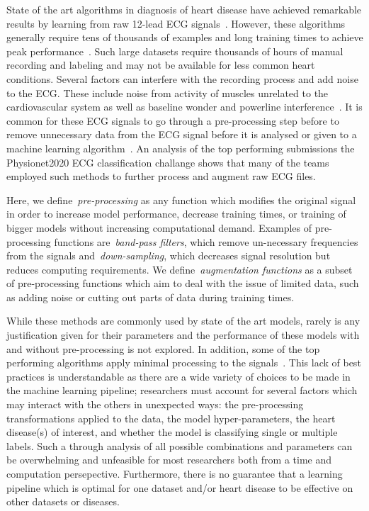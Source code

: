 \documentclass{article}
\begin{document}
State of the art algorithms in diagnosis of heart disease have achieved remarkable results by learning from raw 12-lead ECG signals~\cite{reyna2021will,reyna4issues}. However, these algorithms generally require tens of thousands of examples and long training times to achieve peak performance~\cite{reyna2021will,reyna4issues,natarajan2020wide}. Such large datasets require thousands of hours of manual recording and labeling and may not be available for less common heart conditions. Several factors can interfere with the recording process and add noise to the ECG. These include noise from activity of muscles unrelated to the cardiovascular system as well as baseline wonder and powerline interference~\cite{sornmo2006electrocardiogram}. It is common for these ECG signals to go through a pre-processing step before to remove unnecessary data from the ECG signal before it is analysed or given to a machine learning algorithm~\cite{gacek2011ecg,sornmo2006electrocardiogram}. An analysis of the top performing submissions the Physionet2020 ECG classification challange shows that many of the teams employed such methods to further process and augment raw ECG files.

Here, we define~\textit{pre-processing} as any function which modifies the original signal in order to increase model performance, decrease training times, or training of bigger models without increasing computational demand. Examples of pre-processing functions are~\textit{band-pass filters}, which remove un-necessary frequencies from the signals and~\textit{down-sampling}, which decreases signal resolution but reduces computing requirements.  We define~\textit{augmentation functions} as a subset of pre-processing functions which aim to deal with the issue of limited data, such as adding noise or cutting out parts of data during training times.

While these methods are commonly used by state of the art models, rarely is any justification given for their parameters and the performance of these models with and without pre-processing is not explored. In addition, some of the top performing algorithms apply minimal processing to the signals~\cite{natarajan2020wide,ribeiro2020automatic}. This lack of best practices is understandable as there are a wide variety of choices to be made in the machine learning pipeline; researchers must account for several factors which may interact with the others in unexpected ways: the pre-processing transformations applied to the data, the model hyper-parameters, the heart disease(s) of interest, and whether the model is classifying single or multiple labels. Such a through analysis of all possible combinations and parameters can be overwhelming and unfeasible for most researchers both from a time and computation persepective. Furthermore, there is no guarantee that a learning pipeline which is optimal for one dataset and/or heart disease to be effective on other datasets or diseases. 
\end{document}
